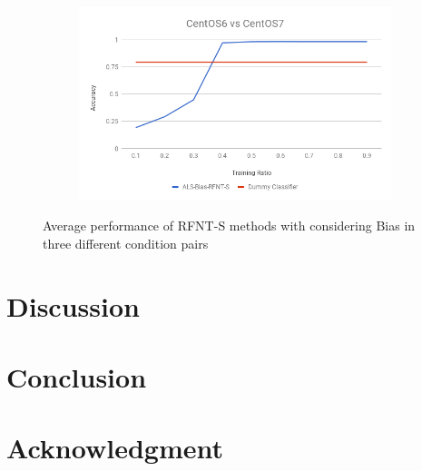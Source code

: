 \documentclass[10pt, conference, compsocconf]{IEEEtran}
\begin{document}
\begin{figure}[h!]
\begin{subfigure}[b]{0.8\linewidth}
                \includegraphics[width=\columnwidth]{figures/ALS-Bias/RFNT-S-ALS-Bias-6vs7-PFS}
        \end{subfigure}
        \caption{Average performance of RFNT-S methods  with considering Bias in three different condition pairs}
        \label{fig:RFNT-S method}
\end{figure}


\section{Discussion}






\section{Conclusion}

\section*{Acknowledgment}



\end{document}
